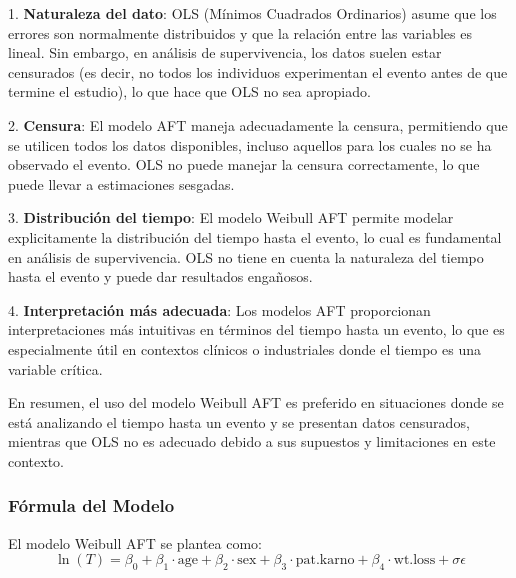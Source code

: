 \documentclass[a4paper,12pt]{article}
\begin{document}
1. \textbf{Naturaleza del dato}: OLS (Mínimos Cuadrados Ordinarios) asume que los errores son normalmente distribuidos y que la relación entre las variables es lineal. Sin embargo, en análisis de supervivencia, los datos suelen estar censurados (es decir, no todos los individuos experimentan el evento antes de que termine el estudio), lo que hace que OLS no sea apropiado.

2. \textbf{Censura}: El modelo AFT maneja adecuadamente la censura, permitiendo que se utilicen todos los datos disponibles, incluso aquellos para los cuales no se ha observado el evento. OLS no puede manejar la censura correctamente, lo que puede llevar a estimaciones sesgadas.

3. \textbf{Distribución del tiempo}: El modelo Weibull AFT permite modelar explicitamente la distribución del tiempo hasta el evento, lo cual es fundamental en análisis de supervivencia. OLS no tiene en cuenta la naturaleza del tiempo hasta el evento y puede dar resultados engañosos.

4. \textbf{Interpretación más adecuada}: Los modelos AFT proporcionan interpretaciones más intuitivas en términos del tiempo hasta un evento, lo que es especialmente útil en contextos clínicos o industriales donde el tiempo es una variable crítica.

En resumen, el uso del modelo Weibull AFT es preferido en situaciones donde se está analizando el tiempo hasta un evento y se presentan datos censurados, mientras que OLS no es adecuado debido a sus supuestos y limitaciones en este contexto.


\subsubsection*{Fórmula del Modelo}
El modelo Weibull AFT se plantea como:
\begin{equation}
\ln(T) = \beta_0 + \beta_1 \cdot \text{age} + \beta_2 \cdot \text{sex} +  \beta_3 \cdot \text{pat.karno} + \beta_4 \cdot \text{wt.loss} + \sigma \epsilon
\end{equation}
\end{document}
